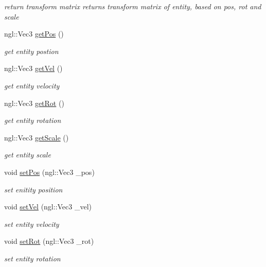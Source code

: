 \begin{DoxyCompactItemize}
\begin{DoxyCompactList}\small\item\em return transform matrix returns transform matrix of entity, based on pos, rot and scale \end{DoxyCompactList}\item 
ngl\-::\-Vec3 \hyperlink{class_entity_a644d5880f63b989fb975b7a999804e1b}{get\-Pos} ()
\begin{DoxyCompactList}\small\item\em get entity postion \end{DoxyCompactList}\item 
ngl\-::\-Vec3 \hyperlink{class_entity_aeaf9c87583d72c2d0b1b89275a747bc2}{get\-Vel} ()
\begin{DoxyCompactList}\small\item\em get entity velocity \end{DoxyCompactList}\item 
ngl\-::\-Vec3 \hyperlink{class_entity_add65f540d6cc42c97fe9552c7bb25c62}{get\-Rot} ()
\begin{DoxyCompactList}\small\item\em get entity rotation \end{DoxyCompactList}\item 
ngl\-::\-Vec3 \hyperlink{class_entity_aa74ac8c5835cafe7779efc39a2eaa8ce}{get\-Scale} ()
\begin{DoxyCompactList}\small\item\em get entity scale \end{DoxyCompactList}\item 
void \hyperlink{class_entity_a1c02a8d465e4c163168164cbf38da541}{set\-Pos} (ngl\-::\-Vec3 \-\_\-pos)
\begin{DoxyCompactList}\small\item\em set enitity position \end{DoxyCompactList}\item 
void \hyperlink{class_entity_a2b5fe9d66b26923a87fff92dbd6e63ed}{set\-Vel} (ngl\-::\-Vec3 \-\_\-vel)
\begin{DoxyCompactList}\small\item\em set entity velocity \end{DoxyCompactList}\item 
void \hyperlink{class_entity_a046b959de6e1306e5bcb8682e6623746}{set\-Rot} (ngl\-::\-Vec3 \-\_\-rot)
\begin{DoxyCompactList}\small\item\em set entity rotation \end{DoxyCompactList}\item 

\end{DoxyCompactItemize}
